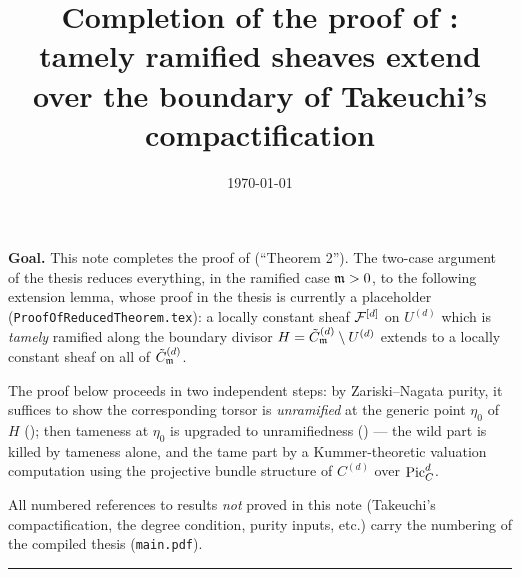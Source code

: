 \documentclass[11pt]{article}
\title{Completion of the proof of
\texorpdfstring{\Cref{lemma:ExtensionOfTamelyRamifiedSheaf}}{the extension lemma}:\\
tamely ramified sheaves extend over the boundary of Takeuchi's compactification}
\author{}
\date{\today}
\begin{document}
\maketitle

\noindent\textbf{Goal.}
This note completes the proof of  (``Theorem 2'').
The two-case argument of the thesis reduces everything, in the ramified case
$\mdls > 0$, to the following extension lemma, whose proof in the thesis is
currently a placeholder (\texttt{ProofOfReducedTheorem.tex}): a locally
constant sheaf $\cF^{[d]}$ on $U^{(d)}$ which is \emph{tamely} ramified along
the boundary divisor $H = \Cmod{d} \setminus U^{(d)}$ extends to a locally
constant sheaf on all of $\Cmod{d}$.

The proof below proceeds in two independent steps: by Zariski--Nagata purity,
it suffices to show the corresponding torsor is \emph{unramified} at the
generic point $\eta_0$ of $H$ (); then
tameness at $\eta_0$ is upgraded to unramifiedness
() --- the wild part is killed
by tameness alone, and the tame part by a Kummer-theoretic valuation
computation using the projective bundle structure of $C^{(d)}$ over
$\PicC[d]$.

All numbered references to results \emph{not} proved in this note
(Takeuchi's compactification, the degree condition, purity inputs, etc.)
carry the numbering of the compiled thesis (\texttt{main.pdf}).

\bigskip
\hrule
\bigskip



\printbibliography
\end{document}
